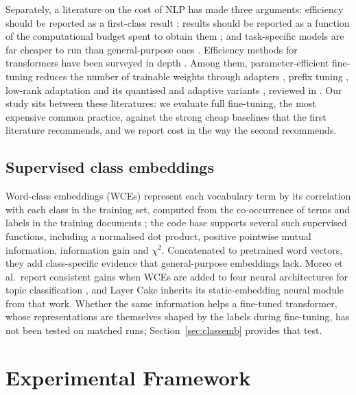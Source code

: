 \documentclass{ijis}
\begin{document}
Separately, a literature on the cost of NLP has made three arguments: efficiency should be reported as a first-class result \cite{strubell2019energy,schwartz2020green,henderson2020towards}; results should be reported as a function of the computational budget spent to obtain them \cite{dodge2019show}; and task-specific models are far cheaper to run than general-purpose ones \cite{luccioni2024power}. Efficiency methods for transformers have been surveyed in depth \cite{treviso2023efficient}. Among them, parameter-efficient fine-tuning reduces the number of trainable weights through adapters \cite{pmlr-v97-houlsby19a}, prefix tuning \cite{li2021prefixtuningoptimizingcontinuousprompts}, low-rank adaptation \cite{hu2021loralowrankadaptationlarge} and its quantised and adaptive variants \cite{dettmers2023qloraefficientfinetuningquantized,zhang2023adaloraadaptivebudgetallocation}, reviewed in \cite{articleding}. Our study sits between these literatures: we evaluate full fine-tuning, the most expensive common practice, against the strong cheap baselines that the first literature recommends, and we report cost in the way the second recommends.

\subsection{Supervised class embeddings}

Word-class embeddings (WCEs) represent each vocabulary term by its correlation with each class in the training set, computed from the co-occurrence of terms and labels in the training documents \cite{moreo2021}; the code base supports several such supervised functions, including a normalised dot product, positive pointwise mutual information, information gain and $\chi^2$. Concatenated to pretrained word vectors, they add class-specific evidence that general-purpose embeddings lack. Moreo et al.\ report consistent gains when WCEs are added to four neural architectures for topic classification \cite{moreo2021}, and Layer Cake inherits its static-embedding neural module from that work. Whether the same information helps a fine-tuned transformer, whose representations are themselves shaped by the labels during fine-tuning, has not been tested on matched runs; Section~\ref{sec:classemb} provides that test.

\section{Experimental Framework}\label{sec:setup}
\end{document}
